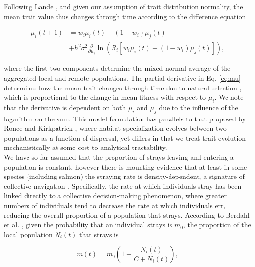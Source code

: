 \documentclass{revtex4}
\begin{document}
Following Lande \citep{Lande:1976ga}, and given our assumption of trait distribution normality, the mean trait value thus changes through time according to the difference equation

\begin{align}
  \label{eq:mu}
  \mu_i(t+1) &= w_i\mu_i(t) + (1-w_i)\mu_j(t) \\ \nonumber
  &+ h^2\sigma^2\frac{\partial}{\partial \mu_i}\ln\left(R_i[w_i \mu_i(t)+ (1-w_i)\mu_j(t)] \right),
\end{align}

\noindent where the first two components determine the mixed normal average of the aggregated local and remote populations.
The partial derivative in Eq. \ref{eq:mu} determines how the mean trait changes through time due to natural selection \citep{Lande:1976ga}, which is proportional to the change in mean fitness with respect to $\mu_i$.
We note that the derivative is dependent on both $\mu_i$ and $\mu_j$ due to the influence of the logarithm on the sum.
This model formulation has parallels to that proposed by Ronce and Kirkpatrick \citep{Ronce:2001dp}, where habitat specialization evolves between two populations as a function of dispersal, yet differs in that we treat trait evolution mechanistically at some cost to analytical tractability.
\\

\noindent We have so far assumed that the proportion of strays leaving and entering a population is constant, however there is mounting evidence that at least in some species (including salmon) the straying rate is density-dependent, a signature of collective navigation \citep{Berdahl:2014bl,Berdahl:2017uu}.
Specifically, the rate at which individuals stray has been linked directly to a collective decision-making phenomenon, where greater numbers of individuals tend to decrease the rate at which individuals err, reducing the overall proportion of a population that strays.
According to Berdahl et al. \citep{Berdahl:2016dx}, given the probability that an individual strays is $m_0$, the proportion of the local population $N_i(t)$ that strays is

\begin{equation}
  m(t) = m_0\left(1- \frac{N_i(t)}{C+N_i(t)}\right),
  \label{eq:ddm}
\end{equation}
\end{document}
